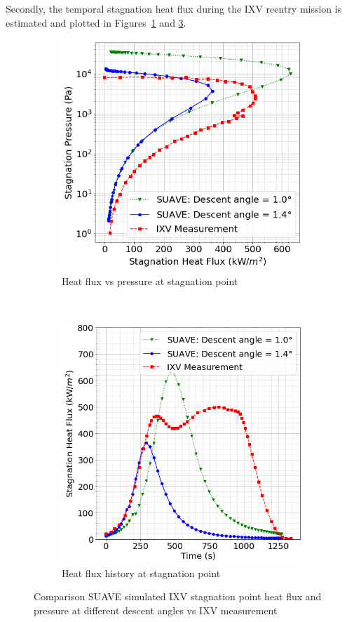 \documentclass[%
 aip,
 amsmath,amssymb,
preprint,%
]{revtex4-1}
\begin{document}
Secondly, the temporal stagnation heat flux during the IXV reentry mission is estimated and plotted in Figures~\ref{valid3_1} and \ref{valid3_2}.
\begin{figure}[ht]
\centering
\begin{subfigure}[b]{0.49\textwidth}
\centering
\includegraphics[width=\textwidth]{IXV_heat_flux_pressure_1976.png}
\caption{Heat flux vs pressure at stagnation point}
\label{valid3_1}
\end{subfigure}
~
\begin{subfigure}[b]{0.49\textwidth}
\centering
\includegraphics[width=\textwidth]{IXV_heat_flux_history_1976.png}
\caption{Heat flux history at stagnation point}
\label{valid3_2}
\end{subfigure}
\caption{Comparison SUAVE simulated IXV stagnation point heat flux and pressure at different descent angles vs IXV measurement}
\end{figure}
\end{document}
